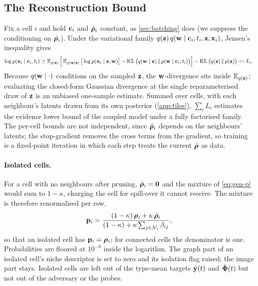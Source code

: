 \subsection{The Reconstruction Bound}
\label{app:bound}

Fix a cell $i$ and hold $\mathbf{c}_i$ and $\bar{\boldsymbol{\rho}}_i$ constant, as \cref{sec:batching} does (we suppress the conditioning on $\bar{\boldsymbol{\rho}}_i$). Under the variational family $q(\mathbf{z})\,q(\mathbf{w} \mid \mathbf{c}_i, t_i, \mathbf{z}, \mathbf{x}_i)$, Jensen's inequality gives
\begin{equation}
  \log p(\mathbf{x}_i \mid \mathbf{c}_i, t_i)
  \geq \operatorname{\mathbb{E}}_{q(\mathbf{z})}\Big[\operatorname{\mathbb{E}}_{q(\mathbf{w} \mid \mathbf{z})}\big[\log p(\mathbf{x}_i \mid \mathbf{z}, \mathbf{w})\big] - \operatorname{KL}\big(q(\mathbf{w} \mid \mathbf{z})\,\|\,p(\mathbf{w} \mid \mathbf{c}_i, t_i)\big)\Big] - \operatorname{KL}\big(q(\mathbf{z})\,\|\,p(\mathbf{z})\big) =: L_i.
  \label{eq:jensen}
\end{equation}
Because $q(\mathbf{w} \mid \cdot)$ conditions on the sampled $\mathbf{z}$, the $\mathbf{w}$-divergence sits inside $\operatorname{\mathbb{E}}_{q(\mathbf{z})}$; evaluating the closed-form Gaussian divergence at the single reparameterised draw of $\mathbf{z}$ is an unbiased one-sample estimate. Summed over cells, with each neighbour's latents drawn from its own posterior (\cref{app:tiles}), $\sum_i L_i$ estimates the evidence lower bound of the coupled model under a fully factorised family. The per-cell bounds are not independent, since $\bar{\boldsymbol{\rho}}_i$ depends on the neighbours' latents; the stop-gradient removes the cross terms from the gradient, so training is a fixed-point iteration in which each step treats the current $\bar{\boldsymbol{\rho}}$ as data.

\paragraph{Isolated cells.} For a cell with no neighbours after pruning, $\bar{\boldsymbol{\rho}}_i = \mathbf{0}$ and the mixture of \cref{eq:gen-p} would sum to $1-\kappa$, charging the cell for spill-over it cannot receive. The mixture is therefore renormalised per row,
\begin{equation}
  \mathbf{p}_i = \frac{(1-\kappa)\,\boldsymbol{\rho}_i + \kappa\,\bar{\boldsymbol{\rho}}_i}{(1-\kappa) + \kappa\sum_{j \in \mathcal{N}_{i}}\beta_{ij}},
  \label{eq:S-renorm}
\end{equation}
so that an isolated cell has $\mathbf{p}_i = \boldsymbol{\rho}_i$; for connected cells the denominator is one. Probabilities are floored at $10^{-8}$ inside the logarithm. The graph part of an isolated cell's niche descriptor is set to zero and its isolation flag raised; the image part stays. Isolated cells are left out of the type-mean targets $\bar{\mathbf{y}}(t)$ and $\bar{\boldsymbol{\Phi}}(t)$ but not out of the adversary or the probes.

